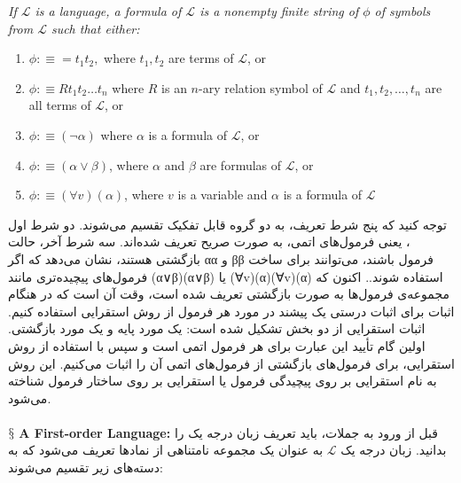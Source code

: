 \documentclass[10pt,a4paper]{article}
\newcommand{\newpoint}[1]{\indent$\mathsection$ \textbf{#1}}
\newcommand{\curveL}{\mathcal{L}}
\begin{document}
                    \begin{define}
                        \textit{If $\curveL$ is a language, a formula of $\curveL$ is a nonempty finite string of $\phi$ of symbols from $\curveL$ such that either:}
                        \begin{enumerate}
                            \item $\phi :\equiv = t_1t_2,$ where $t_1, t_2$ are terms of $\curveL$, or 
                            \item $\phi :\equiv R t_1t_2\dots t_n$ where $R$ is an $n$-ary relation symbol of $\curveL$ and $t_1, t_2, \dots , t_n$ are all terms of $\curveL$, or 
                            \item $\phi :\equiv (\neg \alpha)$ where $\alpha$ is a formula of $\curveL$, or
                            \item $\phi:\equiv (\alpha\lor \beta)$, where $\alpha$ and $\beta$ are formulas of $\curveL$, or 
                            \item $\phi :\equiv (\forall v)(\alpha)$, where $v$ is a variable and $\alpha$ is a formula of $\curveL$
                        \end{enumerate}
                    \end{define}
توجه کنید که پنج شرط تعریف، به دو گروه قابل تفکیک تقسیم می‌شوند. دو شرط اول ، یعنی فرمول‌های اتمی، به صورت صریح تعریف شده‌اند. سه شرط آخر، حالت بازگشتی هستند، نشان می‌دهد که اگر αα و ββ فرمول باشند، می‌توانند برای ساخت فرمول‌های پیچیده‌تری مانند (α∨β)(α∨β) یا (∀v)(α)(∀v)(α) استفاده شوند..
                    اکنون که مجموعه‌ی فرمول‌ها به صورت بازگشتی تعریف شده است، وقت آن است که در هنگام اثبات برای اثبات درستی یک پیشند در مورد هر فرمول از روش استقرایی استفاده کنیم. اثبات استقرایی از دو بخش تشکیل شده است: یک مورد پایه و یک مورد بازگشتی. اولین گام تأیید این عبارت برای هر فرمول اتمی است و سپس با استفاده از روش استقرایی، برای فرمول‌های بازگشتی از فرمول‌های اتمی آن را اثبات می‌کنیم. این روش به نام استقرایی بر روی پیچیدگی فرمول یا استقرایی بر روی ساختار فرمول شناخته می‌شود.
                    \\
                    \\
                    \newpoint{A First-order Language:} قبل از ورود به جملات، باید تعریف زبان درجه یک را بدانید. زبان درجه یک $\curveL$ به عنوان یک مجموعه نامتناهی از نمادها تعریف می‌شود که به دسته‌های زیر تقسیم می‌شوند:
\end{document}
